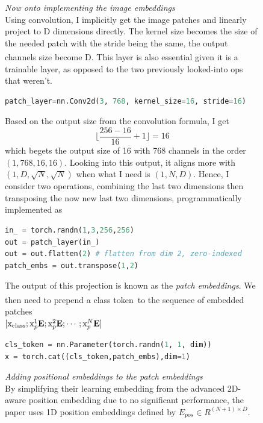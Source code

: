 \documentclass[12pt]{article}
\newcommand{\customtext}[3]{%
    \vspace{#2} %
    \fontsize{13}{8}\textcolor{#1}{\textit{#3}}%
}
\newcommand{\sidecite}[1]{\textsuperscript{\textcolor{blue}{\textbf{\scriptsize#1}}}}
\newcommand{\customtitle}[1]{\fontsize{14}{8}\textcolor{xtitle}{\textit{#1}}\\}
\newcommand{\maincitecount}{\sidecite{\stepcounter{maincite}\themaincite}}
\begin{document}
\begin{figure}[!htb]
\begin{minipage}[t]{0.65\textwidth}
\raggedright
\customtitle{Now onto implementing the image embeddings}
Using convolution, I implicitly get the image patches and linearly project to D dimensions
directly.
The kernel size becomes the size of the needed patch with the stride being the same, 
the output channels size become D\maincitecount. This layer is also essential given it is 
a trainable layer, as opposed to the two previously looked-into ops that weren't.
\begin{lstlisting}[language=python,style=python,basicstyle=\ttfamily\footnotesize]
patch_layer=nn.Conv2d(3, 768, kernel_size=16, stride=16)
\end{lstlisting}
Based on the output size from the convolution formula, I get  
$$\Big\lfloor \frac{256 - 16}{16} + 1 \Big\rfloor=16$$
which begets the output size of 16  with 768 channels in the order 
{\small $(1,768,16,16)$}. Looking into this output, it aligns more with 
{\small $(1,D,\sqrt{N},\sqrt{N})$} when what I need is {\small $(1,N,D)$}.
Hence, I consider two operations, combining the last two dimensions then transposing 
the now new last two dimensions, programmatically implemented as\\ 
\begin{lstlisting}[language=python,style=python,basicstyle=\ttfamily\footnotesize]
in_ = torch.randn(1,3,256,256)
out = patch_layer(in_)
out = out.flatten(2) # flatten from dim 2, zero-indexed
patch_embs = out.transpose(1,2)
\end{lstlisting}
The output of this projection is known as the {\it \color{xtitle} patch embeddings}.
We then need to prepend a class token\maincitecount\ to the sequence of embedded patches\\
$[\text{x}_{\text{class}};\text{x}_p^1\text{\bf E};\text{x}_p^2\text{\bf E};\cdots;\text{x}_p^N\text{\bf E}]$
\begin{lstlisting}[language=python,style=python,basicstyle=\ttfamily\footnotesize]
cls_token = nn.Parameter(torch.randn(1, 1, dim))
x = torch.cat((cls_token,patch_embs),dim=1)
\end{lstlisting}
\customtext{xtitle}{0em}{Adding positional embeddings to the patch embeddings}\\
By simplifying their learning embedding from the advanced 2D-aware position 
embedding due to no significant performance, the paper uses 1D position embeddings
defined by {\small $E_{pos}\in R^{(N+1)\times D}$}.
\begin{lstlisting}[language=python,style=python,basicstyle=\ttfamily\footnotesize]

\end{lstlisting}
\end{minipage}
\end{figure}
\end{document}

